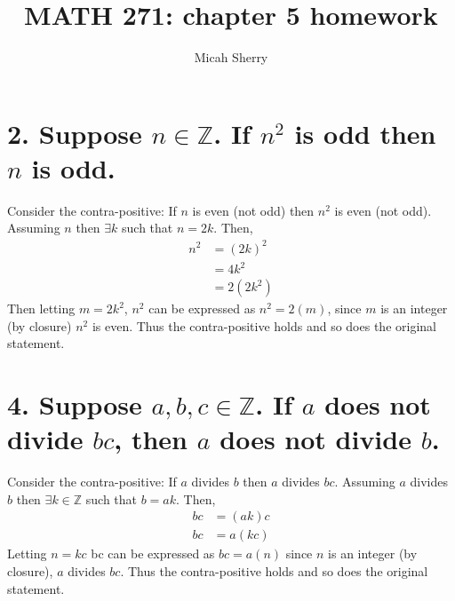 \documentclass{article}
\title{MATH 271: chapter 5 homework}
\author{Micah Sherry}
\begin{document}
	\maketitle
	
\section*{2. Suppose $n \in \mathbb{Z}$. If $n^2$ is odd then $n$ is odd. }
	Consider the contra-positive: If $n$ is even (not odd) then $n^2$ is even (not odd). Assuming $n$ then $\exists k $ such that $n = 2k$.  Then, 
	\begin{align*}
		n^2 &= (2k)^2  \\
		    &= 4k^2    \\
		    &= 2(2k^2) 
	\end{align*}
	Then letting $m = 2k^2$, $n^2$ can be expressed as $n^2=2(m)$, since $m$ is an integer (by closure) $n^2$ is even.
	Thus the contra-positive holds and so does the original statement.

	\section*{4. Suppose $a,b,c \in \mathbb{Z}$. If $a$ does not divide $bc$, then $a$ does not divide $b$.}	
	Consider the contra-positive: If $a$ divides $b$ then $a$ divides $bc$.
	Assuming $a$ divides $b$ then $ \exists k \in \mathbb{Z}$ such that $b = ak$. 
	Then, 
	\begin{align*}
		 bc &= (ak)c \\
	 	 bc &= a(kc) 	
	\end{align*}
	Letting $n = kc$ bc can be expressed as $bc= a(n)$ since $n$ is an integer (by closure), $a$ divides $bc$. Thus the contra-positive holds and so does the original statement.
	

	
	
	
\end{document}
